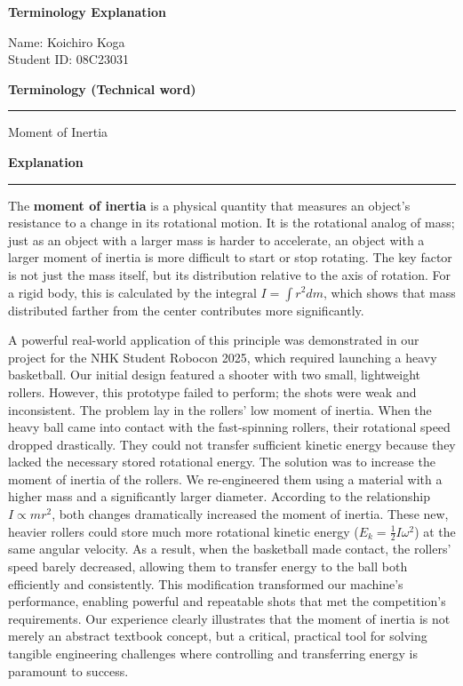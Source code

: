 \documentclass[11pt, dvipdfmx]{jsarticle}
\begin{document}
\pagestyle{empty}

\fontsize{10.5pt}{12.5pt}\selectfont
\linespread{1.1}

\begin{center}
    \Large{\textbf{Terminology Explanation}}
\end{center}

\vspace{0.2cm}

\noindent Name: Koichiro Koga \\
Student ID: 08C23031


\noindent\large{\textbf{Terminology (Technical word)}}
\hrule
\vspace{0.1cm}
\noindent Moment of Inertia

\noindent\large{\textbf{Explanation}}
\hrule
\vspace{0.3cm}
The \textbf{moment of inertia} is a physical quantity that measures an object's resistance to a change in its rotational motion. 
It is the rotational analog of mass; just as an object with a larger mass is harder to accelerate, 
an object with a larger moment of inertia is more difficult to start or stop rotating. 
The key factor is not just the mass itself, but its distribution relative to the axis of rotation. 
For a rigid body, this is calculated by the integral $I = \int r^2 dm$, 
which shows that mass distributed farther from the center contributes more significantly.

A powerful real-world application of this principle was demonstrated in our project for the NHK Student Robocon 2025, 
which required launching a heavy basketball. Our initial design featured a shooter with two small, lightweight rollers. 
However, this prototype failed to perform; the shots were weak and inconsistent. 
The problem lay in the rollers' low moment of inertia. 
When the heavy ball came into contact with the fast-spinning rollers, their rotational speed dropped drastically. 
They could not transfer sufficient kinetic energy because they lacked the necessary stored rotational energy.
The solution was to increase the moment of inertia of the rollers. 
We re-engineered them using a material with a higher mass and a significantly larger diameter. 
According to the relationship $I \propto mr^2$, both changes dramatically increased the moment of inertia. 
These new, heavier rollers could store much more rotational kinetic energy ($E_k = \frac{1}{2}I\omega^2$) at the same angular velocity. 
As a result, when the basketball made contact, the rollers' speed barely decreased, 
allowing them to transfer energy to the ball both efficiently and consistently.
This modification transformed our machine's performance, enabling powerful and repeatable shots that met the competition's requirements. 
Our experience clearly illustrates that the moment of inertia is not merely an abstract textbook concept, 
but a critical, practical tool for solving tangible engineering challenges where controlling and transferring energy is paramount to success.
\end{document}
